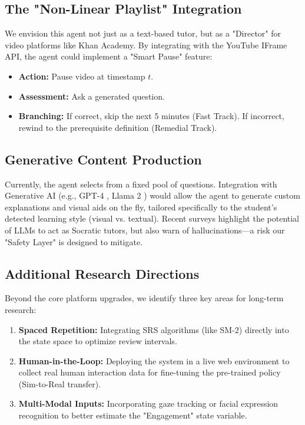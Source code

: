 \documentclass[conference]{IEEEtran}
\begin{document}
\subsection{The "Non-Linear Playlist" Integration}
We envision this agent not just as a text-based tutor, but as a "Director" for video platforms like Khan Academy. By integrating with the YouTube IFrame API, the agent could implement a "Smart Pause" feature:
\begin{itemize}
    \item \textbf{Action:} Pause video at timestamp $t$.
    \item \textbf{Assessment:} Ask a generated question.
    \item \textbf{Branching:} If correct, skip the next 5 minutes (Fast Track). If incorrect, rewind to the prerequisite definition (Remedial Track).
\end{itemize}

\subsection{Generative Content Production}
Currently, the agent selects from a fixed pool of questions. Integration with Generative AI (e.g., GPT-4 \cite{openai2023}, Llama 2 \cite{touvron2023}) would allow the agent to generate custom explanations and visual aids on the fly, tailored specifically to the student's detected learning style (visual vs. textual). Recent surveys \cite{liu2023} highlight the potential of LLMs to act as Socratic tutors, but also warn of hallucinations—a risk our "Safety Layer" is designed to mitigate.



\subsection{Additional Research Directions}
Beyond the core platform upgrades, we identify three key areas for long-term research:
\begin{enumerate}
    \item \textbf{Spaced Repetition:} Integrating SRS algorithms (like SM-2) directly into the state space to optimize review intervals.
    \item \textbf{Human-in-the-Loop:} Deploying the system in a live web environment to collect real human interaction data for fine-tuning the pre-trained policy (Sim-to-Real transfer).
    \item \textbf{Multi-Modal Inputs:} Incorporating gaze tracking or facial expression recognition to better estimate the "Engagement" state variable.
\end{enumerate}
\end{document}
